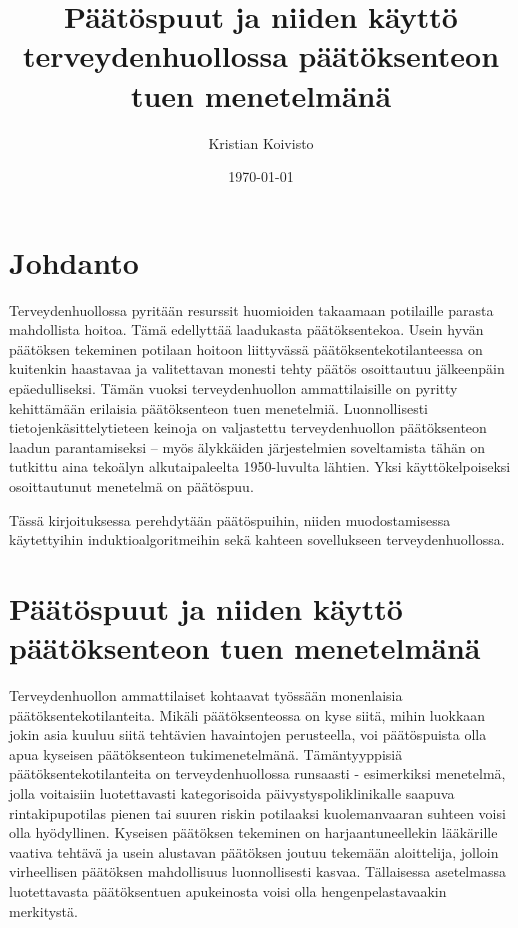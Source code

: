 \documentclass[12pt,finnish]{tktltiki2}
\title{Päätöspuut ja niiden käyttö terveydenhuollossa päätöksenteon tuen menetelmänä}
\author{Kristian Koivisto}
\date{\today}
\theoremstyle{definition}
\theoremstyle{remark}
\begin{document}

\frontmatter      %

\maketitle        %
\makeabstract     %

\tableofcontents  %


\mainmatter       %

\section{Johdanto}
Terveydenhuollossa pyritään resurssit huomioiden takaamaan potilaille parasta mahdollista
hoitoa. Tämä edellyttää laadukasta päätöksentekoa. Usein hyvän päätöksen tekeminen
potilaan hoitoon liittyvässä päätöksentekotilanteessa on kuitenkin haastavaa ja valitettavan
monesti tehty päätös osoittautuu jälkeenpäin epäedulliseksi. Tämän vuoksi terveydenhuollon
ammattilaisille on pyritty kehittämään erilaisia päätöksenteon tuen menetelmiä.
Luonnollisesti tietojenkäsittelytieteen keinoja on valjastettu terveydenhuollon
päätöksenteon laadun parantamiseksi – myös älykkäiden järjestelmien soveltamista tähän
on tutkittu aina tekoälyn alkutaipaleelta 1950-luvulta lähtien. Yksi käyttökelpoiseksi
osoittautunut menetelmä on päätöspuu.

Tässä kirjoituksessa perehdytään päätöspuihin, niiden
muodostamisessa käytettyihin induktioalgoritmeihin sekä kahteen sovellukseen
terveydenhuollossa.


\section{Päätöspuut ja niiden käyttö päätöksenteon tuen menetelmänä}
Terveydenhuollon ammattilaiset kohtaavat työssään monenlaisia päätöksentekotilanteita. Mikäli
päätöksenteossa on kyse siitä, mihin luokkaan jokin asia kuuluu siitä tehtävien havaintojen
perusteella, voi päätöspuista olla apua kyseisen päätöksenteon tukimenetelmänä. Tämäntyyppisiä
päätöksentekotilanteita on terveydenhuollossa runsaasti - esimerkiksi menetelmä, jolla
voitaisiin luotettavasti kategorisoida päivystyspoliklinikalle saapuva rintakipupotilas
pienen tai suuren riskin potilaaksi kuolemanvaaran suhteen voisi olla hyödyllinen.
Kyseisen päätöksen tekeminen on harjaantuneellekin lääkärille vaativa tehtävä ja
usein alustavan päätöksen joutuu tekemään aloittelija, jolloin virheellisen päätöksen
mahdollisuus luonnollisesti kasvaa. Tällaisessa asetelmassa luotettavasta päätöksentuen
apukeinosta voisi olla hengenpelastavaakin merkitystä.
\end{document}
